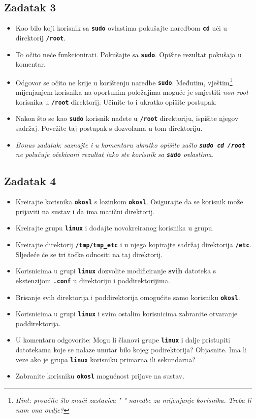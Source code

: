 \documentclass[12pt,a4paper]{article}
\newcommand{\shell}[1]{\texttt{\textbf{#1}}}
\begin{document}
  \subsection*{Zadatak 3}
    \begin{itemize}
      \item Kao bilo koji korisnik sa \shell{sudo} ovlastima pokušajte naredbom \shell{cd} ući u direktorij \shell{/root}.
      \item To očito neće funkcionirati. Pokušajte sa \shell{sudo}. Opišite rezultat pokušaja u komentar.
      \item Odgovor se očito ne krije u korištenju naredbe \shell{sudo}. Međutim, vještim\footnote{\textit{Hint: proučite što znači zastavica "-" naredbe za mijenjanje korisnika. Treba li nam ona ovdje?}} mijenjanjem korisnika na oportunim položajima moguće je smjestiti \textit{non-root} korisnika u \shell{/root} direktorij. Učinite to i ukratko opišite postupak.
      \item Nakon što se kao \shell{sudo} korisnik nađete u \shell{/root} direktoriju, ispišite njegov sadržaj. Povežite taj postupak s dozvolama u tom direktoriju.

      \item \textit{Bonus zadatak: saznajte i u komentaru ukratko opišite zašto \shell{sudo cd /root} ne polučuje očekivani rezultat iako ste korisnik sa \shell{sudo} ovlastima.}
    \end{itemize}

  \subsection*{Zadatak 4}
    \begin{itemize}
      \item Kreirajte korisnika \shell{okosl} s lozinkom \shell{okosl}. Osigurajte da se korisnik može prijaviti na sustav i da ima matični direktorij.
      \item Kreirajte grupu \shell{linux} i dodajte novokreiranog korisnika u grupu.
      \item Kreirajte direktorij \shell{/tmp/tmp\_etc} i u njega kopirajte sadržaj direktorija \shell{/etc}. Sljedeće će se tri točke odnositi na taj direktorij.
      \item Korisnicima u grupi \shell{linux} dozvolite modificiranje \textbf{svih} datoteka s ekstenzijom \shell{.conf} u direktoriju i poddirektorijima.
      \item Brisanje svih direktorija i poddirektorija omogućite samo korisniku \shell{okosl}.
        \item Korisnicima u grupi \shell{linux} i svim ostalim korisnicima zabranite otvaranje poddirektorija.
        \item[] U komentaru odgovorite: Mogu li članovi grupe \shell{linux} i dalje pristupiti datotekama koje se nalaze unutar bilo kojeg podirektorija? Objasnite. Ima li veze ako je grupa \shell{linux} korisniku primarna ili sekundarna?
      \item Zabranite korisniku \shell{okosl} mogućnost prijave na sustav.
    \end{itemize}
\end{document}

